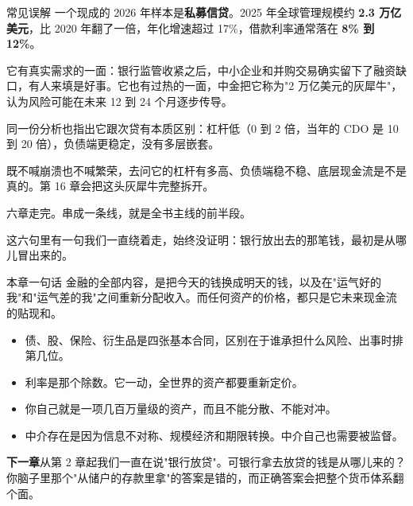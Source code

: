 \begin{mythbox}{常见误解}
一个现成的 2026 年样本是\textbf{私募信贷}。2025 年全球管理规模约 \textbf{2.3 万亿美元}，比 2020 年翻了一倍，年化增速超过 17\%，借款利率通常落在 \textbf{8\% 到 12\%}。

它有真实需求的一面：银行监管收紧之后，中小企业和并购交易确实留下了融资缺口，有人来填是好事。它也有过热的一面，中金把它称为"2 万亿美元的灰犀牛"，认为风险可能在未来 12 到 24 个月逐步传导。

同一份分析也指出它跟次贷有本质区别：杠杆低（0 到 2 倍，当年的 CDO 是 10 到 20 倍），负债端更稳定，没有多层嵌套。

既不喊崩溃也不喊繁荣，去问它的杠杆有多高、负债端稳不稳、底层现金流是不是真的。第 16 章会把这头灰犀牛完整拆开。

\end{mythbox}

\bookbreak

六章走完。串成一条线，就是全书主线的前半段。

\begin{flowlist}
\end{flowlist}

这六句里有一句我们一直绕着走，始终没证明：银行放出去的那笔钱，最初是从哪儿冒出来的。

\begin{takeaway}{本章一句话}
金融的全部内容，是把今天的钱换成明天的钱，以及在"运气好的我"和"运气差的我"之间重新分配收入。而任何资产的价格，都只是它未来现金流的贴现和。

\begin{itemize}
  \item 债、股、保险、衍生品是四张基本合同，区别在于谁承担什么风险、出事时排第几位。
  \item 利率是那个除数。它一动，全世界的资产都要重新定价。
  \item 你自己就是一项几百万量级的资产，而且不能分散、不能对冲。
  \item 中介存在是因为信息不对称、规模经济和期限转换。中介自己也需要被监督。
\end{itemize}

\end{takeaway}

\begin{bridgebox}
\textbf{下一章}从第 2 章起我们一直在说"银行放贷"。可银行拿去放贷的钱是从哪儿来的？你脑子里那个"从储户的存款里拿"的答案是错的，而正确答案会把整个货币体系翻个面。
\end{bridgebox}


